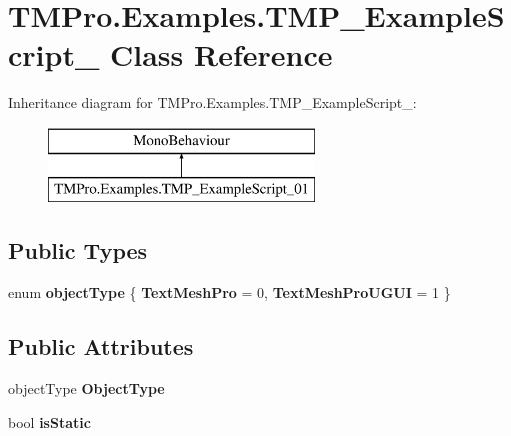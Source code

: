\hypertarget{class_t_m_pro_1_1_examples_1_1_t_m_p___example_script__01}{}\section{T\+M\+Pro.\+Examples.\+T\+M\+P\+\_\+\+Example\+Script\+\_ Class Reference}
\label{class_t_m_pro_1_1_examples_1_1_t_m_p___example_script__01}
Inheritance diagram for T\+M\+Pro.\+Examples.\+T\+M\+P\+\_\+\+Example\+Script\+\_\+:\begin{figure}[H]
\begin{center}
\leavevmode
\includegraphics[height=2.000000cm]{class_t_m_pro_1_1_examples_1_1_t_m_p___example_script__01}
\end{center}
\end{figure}
\subsection*{Public Types}
\begin{DoxyCompactItemize}
\item 
\mbox{\label{class_t_m_pro_1_1_examples_1_1_t_m_p___example_script__01_a7581fa07718f773bf9347019769d2c80}} 
enum {\bfseries object\+Type} \{ {\bfseries Text\+Mesh\+Pro} = 0, 
{\bfseries Text\+Mesh\+Pro\+U\+G\+UI} = 1
 \}
\end{DoxyCompactItemize}
\subsection*{Public Attributes}
\begin{DoxyCompactItemize}
\item 
\mbox{\label{class_t_m_pro_1_1_examples_1_1_t_m_p___example_script__01_aeb3d9e7c797f07f254f4f280467b7cee}} 
object\+Type {\bfseries Object\+Type}
\item 
\mbox{\label{class_t_m_pro_1_1_examples_1_1_t_m_p___example_script__01_a5d554a45b55df66f623b13ccb74d3455}} 
bool {\bfseries is\+Static}
\end{DoxyCompactItemize}
